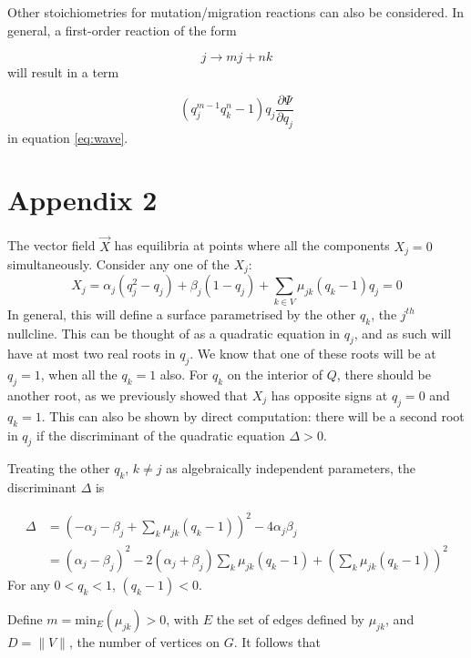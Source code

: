 \documentclass{article}
\begin{document}
Other stoichiometries for mutation/migration reactions can also be considered.
In general, a first-order reaction of the form

\begin{equation}
    j \rightarrow m j + n k
\end{equation}
will result in a term

\begin{equation}
    (q_j^{m-1} q_k^n - 1) q_j \frac{\partial \Psi}{\partial q_j}
\end{equation}
in equation \eqref{eq:wave}.

\section{Appendix 2}

The vector field $\vec{X}$ has equilibria at points where all the components
$X_j = 0$ simultaneously. Consider any one of the $X_j$:
\begin{equation}
    X_j = \alpha_j (q_j^2 - q_j) + \beta_j (1 - q_j) 
          + \sum_{k \in V} \mu_{jk} (q_k - 1) q_j = 0
\end{equation}
In general, this will define a surface parametrised by the other $q_k$, the
$j^{th}$ nullcline.
This can be thought of as a quadratic equation in $q_j$, and as such will have
at most two real roots in $q_j$. We know that one of these roots will be at $q_j
= 1$, when all the $q_k = 1$ also. For $q_k$ on the interior of $Q$, there
should be another root, as we previously showed that $X_j$ has opposite signs at
$q_j = 0$ and $q_k = 1$. This can also be shown by direct computation: there
will be a second root in $q_j$ if the discriminant of the quadratic equation $\Delta > 0$.

Treating the other $q_k$, $k \neq j$ as algebraically independent parameters,
the discriminant $\Delta$ is

\begin{align}
    \Delta &= (-\alpha_j -\beta_j + \sum_k \mu_{jk} (q_k - 1))^2 - 4\alpha_j \beta_j
    \nonumber \\
    &= (\alpha_j - \beta_j)^2 - 2 (\alpha_j + \beta_j) \sum_k \mu_{jk} (q_k - 1)
    +(\sum_k \mu_{jk} (q_k - 1))^2
\end{align}
For any $0 < q_k < 1$, $(q_k - 1) < 0$.

Define $m = \mathrm{min}_E(\mu_{jk}) > 0$, with $E$ the set of edges defined by
$\mu_{jk}$, and $D = \|V\|$, the number of vertices on $G$. It follows that
\end{document}
